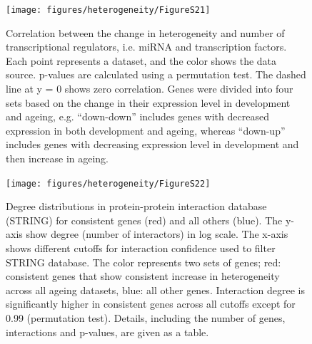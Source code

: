 \documentclass[12pt,twoside]{unicam}
\begin{document}
\begin{figure}

{\centering \texttt{[image: figures/heterogeneity/FigureS21]} 

}

\caption[Correlation between the change in heterogeneity and number of transcriptional regulators, stratified by the gene expression profile.]{Correlation between the change in heterogeneity and number of transcriptional regulators, i.e. miRNA and transcription factors. Each point represents a dataset, and the color shows the data source. p-values are calculated using a permutation test. The dashed line at y = 0 shows zero correlation. Genes were divided into four sets based on the change in their expression level in development and ageing, e.g. “down-down” includes genes with decreased expression in both development and ageing, whereas “down-up” includes genes with decreasing expression level in development and then increase in ageing.}\label{fig:hetFigS21}
\end{figure}

\begin{figure}

{\centering \texttt{[image: figures/heterogeneity/FigureS22]} 

}

\caption[Degree distributions in protein-protein interaction database (STRING) for consistent genes and all others.]{Degree distributions in protein-protein interaction database (STRING) for consistent genes (red) and all others (blue). The y-axis show degree (number of interactors) in log scale. The x-axis shows different cutoffs for interaction confidence used to filter STRING database.  The color represents two sets of genes; red: consistent genes that show consistent increase in heterogeneity across all ageing datasets, blue: all other genes. Interaction degree is significantly higher in consistent genes across all cutoffs except for 0.99 (permutation test). Details, including the number of genes, interactions and p-values, are given as a table.}\label{fig:hetFigS22}
\end{figure}
\end{document}
